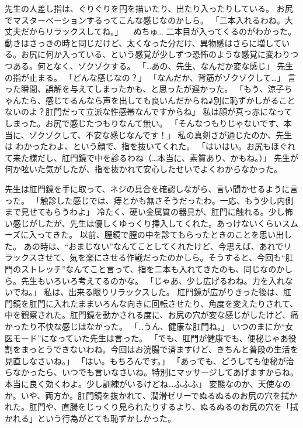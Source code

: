 先生の人差し指は、ぐりぐりを円を描いたり、出たり入ったりしている。
お尻でマスターベーションするってこんな感じなのかしら。
「二本入れるわね。大丈夫だからリラックスしてね。」
　ぬちゅ…
二本目が入ってくるのがわかった。動きはさっきの時と同じだけど、太くなった分だけ、異物感はさらに増している。お尻に何か入っている、という感覚が少しずつ恐怖のような感覚に変わりつつある。何となく、ゾクゾクする。
「…あの、先生、なんだか変な感じ」
先生の指が止まる。
「どんな感じなの？」
「なんだか、背筋がゾクゾクして…」
言った瞬間、誤解を与えてしまったかも、と思ったが遅かった。
「もう、涼子ちゃんたら、感じてるんなら声を出しても良いんだからね♪別に恥ずかしがることないのよ？肛門だって立派な性感帯なんですからね」
私は顔が真っ赤になってしまった。お尻で感じたつもりなんて無い。
「そんなつもりじゃないです、本当に、ゾクゾクして、不安な感じなんです！」
私の真剣さが通じたのか、先生は わかったわよ、という顔で、指を抜いてくれた。
「はいはい。お尻もほぐれて来た様だし、肛門鏡で中を診るわね（…本当に、素質あり、かもね。）」
先生が何か呟いた気がしたが、指を抜かれて安心したせいでよくわからなかった。

先生は肛門鏡を手に取って、ネジの具合を確認しながら、言い聞かせるように言った。
「触診した感じでは、痔とかも無さそうだったわ。一応、もう少し内側まで見せてもらうわよ」
冷たく、硬い金属質の器具が、肛門に触れる。少し怖い感じがしたが、先生は優しくゆっくり挿入してくれた。あっけないくらいスムーズに入ってきた。
以前、膣鏡で膣の中を診てもらったときのことを思い出した。
あの時は、“おまじない”なんてことしてくれたけど、今思えば、あれでリラックスさせて、気を楽にさせる作戦だったのかしら。そうすると、今回も“肛門のストレッチ”なんてこと言って、指を二本も入れてきたのも、同じなのかしら。先生もいろいろ考えてるのかな。
「じゃあ、少し広げるわね。力を入れないでね。」
私は、出来る限りリラックスした。
肛門鏡が広がりきった後は、肛門鏡を肛門に入れたままいろんな向きに回転させたり、角度を変えたりされて、中を観察された。肛門鏡を動かされる度に、お尻の穴が変な感じがしたけど、痛かったり不快な感じはなかった。
「…うん、健康な肛門ね。」
いつのまにか“女医モード”になっていた先生は言った。
「でも、肛門が健康でも、便秘じゃあ役割をまっとうできないわね。今回はお浣腸で済ますけど、きちんと普段の生活を見直しなさいね。」
「はい。もちろんです。」
「あっでも、どうしても便秘が治らなかったら、いつでも言いなさいね。特別にマッサージしてあげますからね。本当に良く効くわよ。少し訓練がいるけどね…ふふふ」
変態なのか、天使なのか。いや、両方か。肛門鏡を抜かれて、潤滑ゼリーでぬるぬるのお尻の穴を拭かれた。肛門や、直腸をじっくり見られたりするより、ぬるぬるのお尻の穴を「拭かれる」という行為がとても恥ずかしかった。


